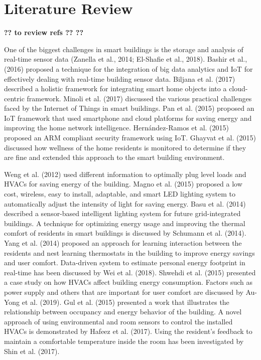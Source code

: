 \documentclass[]{interact}
\theoremstyle{plain}%
\theoremstyle{definition}
\theoremstyle{remark}
\begin{document}
\section{Literature Review}

\textbf{?? to review refs ?? ??}

One of the biggest challenges in smart buildings is the storage and analysis of real-time sensor data (Zanella et al., 2014; El-Shafie et al., 2018).  Bashir et al., (2016) proposed a technique for the integration of big data analytics and IoT for effectively dealing with real-time building sensor data. Biljana et al. (2017) described a holistic framework for integrating smart home objects into a cloud-centric framework. Minoli et al. (2017) discussed the various practical challenges faced by the Internet of Things in smart buildings. Pan et al. (2015) proposed an IoT framework that used smartphone and cloud platforms for saving energy and improving the home network intelligence. Hernández-Ramos et al. (2015) proposed an ARM compliant security framework using IoT. Ghayvat et al. (2015) discussed how wellness of the home residents is monitored to determine if they are fine and extended this approach to the smart building environment. 

Weng et al. (2012) used different information to optimally plug level loads and HVACs for saving energy of the building. Magno et al. (2015) proposed a low cost, wireless, easy to install, adaptable, and smart LED lighting system to automatically adjust the intensity of light for saving energy. Basu et al. (2014) described a sensor-based intelligent lighting system for future grid-integrated buildings. A technique for optimizing energy usage and improving the thermal comfort of residents in smart buildings is discussed by Schumann et al. (2014). Yang et al. (2014) proposed an approach for learning interaction between the residents and nest learning thermostats in the building to improve energy savings and user comfort. Data-driven system to estimate personal energy footprint in real-time has been discussed by Wei et al. (2018). Shwehdi et al. (2015) presented a case study on how HVACs affect building energy consumption. Factors such as power supply and others that are important for user comfort are discussed by Au-Yong et al. (2019). Gul et al. (2015) presented a work that illustrates the relationship between occupancy and energy behavior of the building. A novel approach of using environmental and room sensors to control the installed HVACs is demonstrated by Hafeez et al. (2017). Using the resident’s feedback to maintain a comfortable temperature inside the room has been investigated by Shin et al. (2017). 
\end{document}
